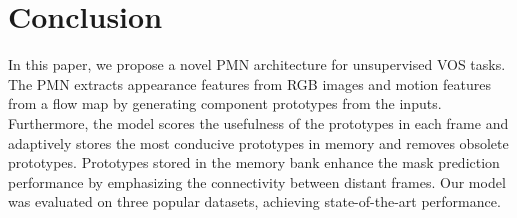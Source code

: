 \documentclass[10pt,twocolumn,letterpaper]{article}
\begin{document}
\section{Conclusion}
In this paper, we propose a novel PMN architecture for unsupervised VOS tasks. The PMN extracts appearance features from RGB images and motion features from a flow map by generating component prototypes from the inputs. Furthermore, the model scores the usefulness of the prototypes in each frame and adaptively stores the most conducive prototypes in memory and removes obsolete prototypes. Prototypes stored in the memory bank enhance the mask prediction performance by emphasizing the connectivity between distant frames. Our model was evaluated on three popular datasets, achieving state-of-the-art performance.


{\small


}
\end{document}
